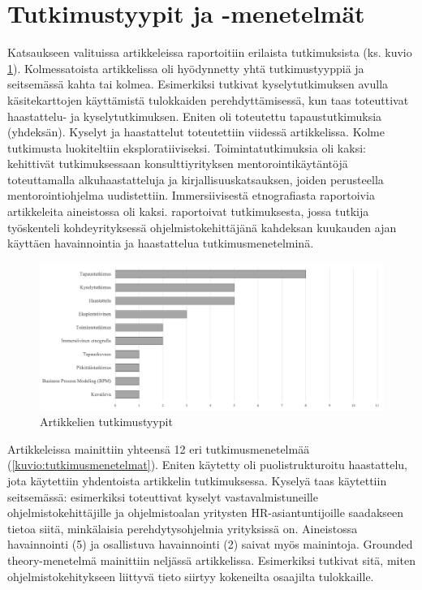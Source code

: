 \documentclass[utf8]{gradu3}
\begin{document}
\section{Tutkimustyypit ja -menetelmät}
\label{luku-tulokset-tutkimustyypit-ja-menetelmat}

Katsaukseen valituissa artikkeleissa raportoitiin erilaista tutkimuksista (ks. kuvio \ref{kuvio:tutkimustyypit}). Kolmessatoista artikkelissa oli hyödynnetty yhtä tutkimustyyppiä ja seitsemässä kahta tai kolmea. Esimerkiksi \textcite{azanza-ym-2021} tutkivat kyselytutkimuksen avulla käsitekarttojen käyttämistä tulokkaiden perehdyttämisessä, kun taas \textcite{pham-ym-2017} toteuttivat haastattelu- ja kyselytutkimuksen. Eniten oli toteutettu tapaustutkimuksia (yhdeksän). Kyselyt ja haastattelut toteutettiin viidessä artikkelissa. Kolme tutkimusta luokiteltiin eksploratiiviseksi. Toimintatutkimuksia oli kaksi: \textcite{bjornson-dingsøyr-2005} kehittivät tutkimuksessaan konsulttiyrityksen mentorointikäytäntöjä toteuttamalla alkuhaastatteluja ja kirjallisuuskatsauksen, joiden perusteella mentorointiohjelma uudistettiin. Immersiivisestä etnografiasta raportoivia artikkeleita aineistossa oli kaksi. \textcite{kumar-ym-2016} raportoivat tutkimuksesta, jossa tutkija työskenteli kohdeyrityksessä ohjelmistokehittäjänä kahdeksan kuukauden ajan käyttäen havainnointia ja haastattelua tutkimusmenetelminä.

\begin{figure}[h]
    \centering
    \includegraphics[width=\textwidth]{media/tutkimustyypit.png}
    \caption{Artikkelien tutkimustyypit}
    \label{kuvio:tutkimustyypit}
\end{figure}

Artikkeleissa mainittiin yhteensä 12 eri tutkimusmenetelmää (\ref{kuvio:tutkimusmenetelmat}). Eniten käytetty oli puolistrukturoitu haastattelu, jota käytettiin yhdentoista artikkelin tutkimuksessa. Kyselyä taas käytettiin seitsemässä: esimerkiksi \textcite{kulkarni-ym-2010} toteuttivat kyselyt vastavalmistuneille ohjelmistokehittäjille ja ohjelmistoalan yritysten HR-asiantuntijoille saadakseen tietoa siitä, minkälaisia perehdytysohjelmia yrityksissä on. Aineistossa havainnointi (5) ja osallistuva havainnointi (2) saivat myös mainintoja. Grounded theory-menetelmä mainittiin neljässä artikkelissa. Esimerkiksi \textcite{viana-ym-2014} tutkivat sitä, miten ohjelmistokehitykseen liittyvä tieto siirtyy kokeneilta osaajilta tulokkaille. 
\end{document}
